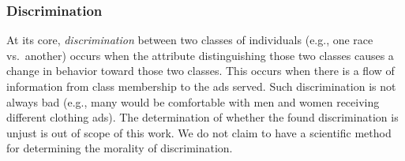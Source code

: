 \documentclass[10pt, onecolumn]{report}
\begin{document}

\subsubsection{Discrimination}

At its core, \emph{discrimination} between two classes of individuals 
(e.g., one race vs.\ another) occurs when the attribute distinguishing 
those two classes causes a change in behavior toward those two classes.
This occurs when there is a flow of information from class membership 
to the ads served. 
Such discrimination is not always bad (e.g., many would 
be comfortable with men and women receiving different clothing ads). 
The determination of whether the found discrimination is unjust 
is out of scope of this work. We do not claim to have a scientific method for 
determining the morality of discrimination.
\end{document}
